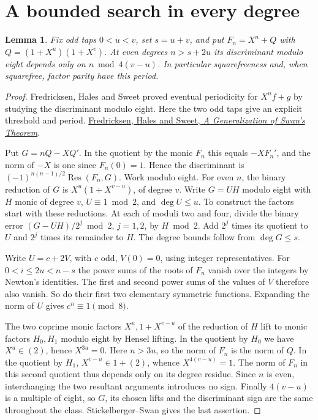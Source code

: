 \documentclass[11pt]{article}
\newtheorem{lemma}[theorem]{Lemma}
\begin{document}
\section{A bounded search in every degree}
\label{sec:fixed-tap-even-cover}
\begin{lemma}\label{lem:even-tap-tail-period}
Fix odd taps \(0<u<v\), set \(s=u+v\), and put
\(F_n=X^n+Q\) with \(Q=(1+X^u)(1+X^v)\). At even degrees
\(n>s+2u\) its discriminant modulo eight depends only on
\(n\bmod 4(v-u)\). In particular squarefreeness and, when
squarefree, factor parity have this period.
\end{lemma}
\begin{proof}
Fredricksen, Hales and Sweet proved eventual periodicity
for \(X^n f+g\) by studying the discriminant modulo eight.
Here the two odd taps give an explicit threshold and period.
\href{https://doi.org/10.2307/2008235}{Fredricksen, Hales and Sweet,
\emph{A Generalization of Swan's Theorem}}.

Put \(G=nQ-XQ'\). In the quotient by the monic \(F_n\) this equals
\(-XF_n'\), and the norm of \(-X\) is one since \(F_n(0)=1\).
Hence the discriminant is
\((-1)^{n(n-1)/2}\operatorname{Res}(F_n,G)\).
Work modulo eight. For even \(n\), the binary reduction of \(G\)
is \(X^u(1+X^{v-u})\), of degree \(v\). Write \(G=UH\) modulo
eight with \(H\) monic of degree \(v\), \(U\equiv1\bmod2\),
and \(\deg U\le u\). To construct the factors start with these
reductions. At each of moduli two and four, divide the binary
error \((G-UH)/2^j\bmod2\), \(j=1,2\), by \(H\bmod2\).
Add \(2^j\) times its quotient to \(U\) and \(2^j\) times
its remainder to \(H\). The degree bounds follow from \(\deg G\le s\).

Write \(U=c+2V\), with \(c\) odd, \(V(0)=0\), using integer
representatives. For \(0<i\le2u<n-s\) the power sums of the
roots of \(F_n\) vanish over the integers by Newton's identities.
The first and second power sums of the values of \(V\) therefore
also vanish. So do their first two elementary symmetric functions.
Expanding the norm of \(U\) gives \(c^n\equiv1\pmod8\).

The two coprime monic factors \(X^u,1+X^{v-u}\) of the reduction
of \(H\) lift to monic factors \(H_0,H_1\) modulo eight by Hensel
lifting. In the quotient by \(H_0\) we have \(X^u\in(2)\),
hence \(X^{3u}=0\). Here \(n>3u\), so the norm of \(F_n\) is
the norm of \(Q\). In the quotient by \(H_1\),
\(X^{v-u}\in1+(2)\), whence \(X^{4(v-u)}=1\). The norm of
\(F_n\) in this second quotient thus depends only on its degree
residue. Since \(n\) is even, interchanging the two resultant
arguments introduces no sign. Finally \(4(v-u)\) is a multiple of
eight, so \(G\), its chosen lifts and the discriminant sign are
the same throughout the class. Stickelberger--Swan gives the last
assertion.
\end{proof}
\end{document}
